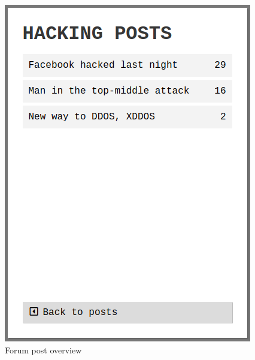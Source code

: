 \begin{table}[H]
\begin{minipage}{.33\textwidth}
\begin{figure}[H]
            \includegraphics[width=0.95\linewidth]{InteraktionsDesign/Assets/Prototype/6.png}
            \caption{Forum post overview}
            \label{fig:prototype6}
        \end{figure}
    \end{minipage}
    \begin{minipage}{.33\textwidth}
        \begin{figure}[H]
            \centering

\end{figure}
\end{minipage}
\end{table}

